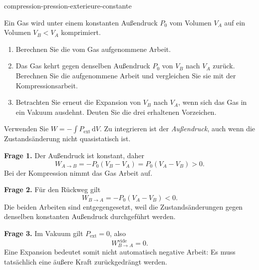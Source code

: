 \begin{exo}{compression-pression-exterieure-constante}

Ein Gas wird unter einem konstanten Außendruck $P_0$ vom Volumen $V_A$ auf
ein Volumen $V_B<V_A$ komprimiert.

\begin{enumerate}
\item Berechnen Sie die vom Gas aufgenommene Arbeit.
\item Das Gas kehrt gegen denselben Außendruck $P_0$ von $V_B$ nach $V_A$ zurück. Berechnen Sie die aufgenommene Arbeit und vergleichen Sie sie mit der Kompressionsarbeit.
\item Betrachten Sie erneut die Expansion von $V_B$ nach $V_A$, wenn sich das Gas in ein Vakuum ausdehnt. Deuten Sie die drei erhaltenen Vorzeichen.
\end{enumerate}

\begin{indication}
Verwenden Sie $W=-\int P_{\mathrm{ext}}\,\mathrm{d}V$. Zu integrieren ist der
\emph{Außendruck}, auch wenn die Zustandsänderung nicht quasistatisch ist.
\end{indication}

\begin{solution}
\textbf{Frage 1.} Der Außendruck ist konstant, daher
\[
W_{A\to B}=-P_0(V_B-V_A)=P_0(V_A-V_B)>0.
\]
Bei der Kompression nimmt das Gas Arbeit auf.

\textbf{Frage 2.} Für den Rückweg gilt
\[
W_{B\to A}=-P_0(V_A-V_B)<0.
\]
Die beiden Arbeiten sind entgegengesetzt, weil die Zustandsänderungen gegen
denselben konstanten Außendruck durchgeführt werden.

\textbf{Frage 3.} Im Vakuum gilt $P_{\mathrm{ext}}=0$, also
\[
W_{B\to A}^{\mathrm{vide}}=0.
\]
Eine Expansion bedeutet somit nicht automatisch negative Arbeit: Es muss
tatsächlich eine äußere Kraft zurückgedrängt werden.
\end{solution}
\end{exo}
